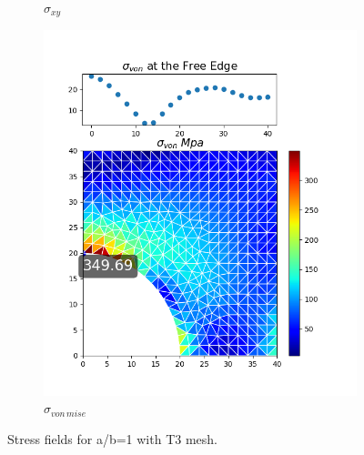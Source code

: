 \documentclass[twoside,twocolumn,10pt]{article}
\begin{document}
\begin{figure}[!ht]
\begin{subfigure}[c]{0.26\textwidth}
    \caption{$\sigma_{xy}$}
    \label{fig:xy_tri_1}
  \end{subfigure}%
  \begin{subfigure}[c]{0.26\textwidth}
    \includegraphics[width=1.\linewidth]{Q2_5/Q5_1_von_triangle.png}
    \caption{$\sigma_{von \, mise}$}
    \label{fig:von_tri_1}
  \end{subfigure}
  \caption{Stress fields for a/b=1 with T3 mesh.}
  \label{fig:tri_1}
\end{figure}
\end{document}
